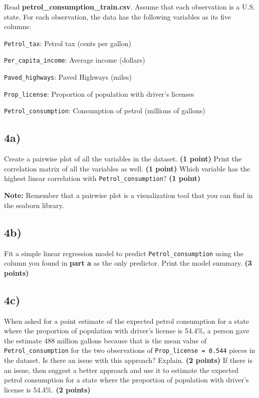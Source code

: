 \documentclass[
  letterpaper,
  DIV=11,
  numbers=noendperiod]{scrreprt}
\begin{document}
Read \textbf{petrol\_consumption\_train.csv}. Assume that each
observation is a U.S. state. For each observation, the data has the
following variables as its five columns:

\texttt{Petrol\_tax}: Petrol tax (cents per gallon)

\texttt{Per\_capita\_income}: Average income (dollars)

\texttt{Paved\_highways}: Paved Highways (miles)

\texttt{Prop\_license}: Proportion of population with driver's licenses

\texttt{Petrol\_consumption}: Consumption of petrol (millions of
gallons)

\subsection{4a)}\label{a-2}

Create a pairwise plot of all the variables in the dataset. \textbf{(1
point)} Print the correlation matrix of all the variables as well.
\textbf{(1 point)} Which variable has the highest linear correlation
with \texttt{Petrol\_consumption}? \textbf{(1 point)}

\textbf{Note:} Remember that a pairwise plot is a visualization tool
that you can find in the seaborn library.

\subsection{4b)}\label{b-2}

Fit a simple linear regression model to predict
\texttt{Petrol\_consumption} using the column you found in \textbf{part
a} as the only predictor. Print the model summary. \textbf{(3 points)}

\subsection{4c)}\label{c-1}

When asked for a point estimate of the expected petrol consumption for a
state where the proportion of population with driver's license is
54.4\%, a person gave the estimate 488 million gallons because that is
the mean value of \texttt{Petrol\_consumption} for the two observations
of \texttt{Prop\_license\ =\ 0.544} pieces in the dataset. Is there an
issue with this approach? Explain. \textbf{(2 points)} If there is an
issue, then suggest a better approach and use it to estimate the
expected petrol consumption for a state where the proportion of
population with driver's license is 54.4\%. \textbf{(2 points)}
\end{document}
